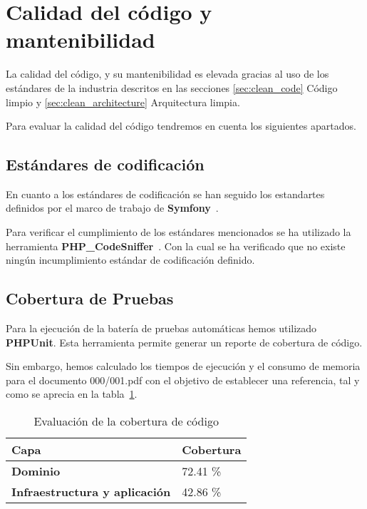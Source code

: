 \section{Calidad del código y mantenibilidad}

La calidad del código, y su mantenibilidad es elevada gracias al uso de los estándares de la industria descritos en
las secciones \ref{sec:clean_code} Código limpio y \ref{sec:clean_architecture} Arquitectura limpia.

Para evaluar la calidad del código tendremos en cuenta los siguientes apartados.

\subsection*{Estándares de codificación}

En cuanto a los estándares de codificación se han seguido los estandartes definidos por el marco de trabajo de
\textbf{Symfony}~\cite{https://symfony.com/doc/7.0/contributing/code/standards.html}.

Para verificar el cumplimiento de los estándares mencionados se ha utilizado la herramienta
\textbf{PHP\_CodeSniffer}~\cite{https://github.com/squizlabs/PHP_CodeSniffer}.
Con la cual se ha verificado que no existe ningún incumplimiento estándar de codificación definido.

\subsection*{Cobertura de Pruebas}

Para la ejecución de la batería de pruebas automáticas hemos utilizado \textbf{PHPUnit}.
Esta herramienta permite generar un reporte de cobertura de código.

Sin embargo, hemos calculado los tiempos de ejecución y el consumo de memoria para el documento 000/001.pdf con el
objetivo de establecer una referencia, tal y como se aprecia en la tabla~\ref{tab:phpunit_report}.

\begin{table}[h]
    \renewcommand{\arraystretch}{1.5}
    \setlength{\tabcolsep}{10pt}
    \centering
    \begin{tabular}{>{\bfseries}p{} p{}  }
        \toprule
        \textbf{Capa}                         & \textbf{Cobertura} \\
        \midrule
        \textbf{Dominio}                      & 72.41 \%           \\
        \textbf{Infraestructura y aplicación} & 42.86 \%           \\
        \bottomrule
    \end{tabular}
    \caption{Evaluación de la cobertura de código}
    \label{tab:phpunit_report}
\end{table}

